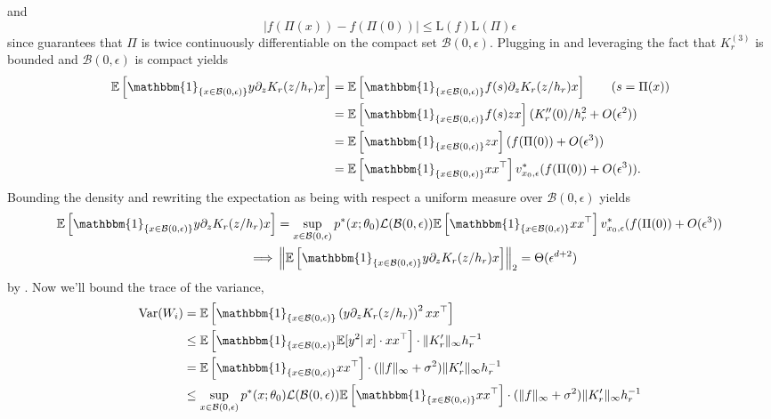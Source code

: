 \documentclass[11pt]{article}
\begin{document}
and
\[\left|f(\Pi(x)) - f(\Pi(0))\right| \leq \text{L}(f)\text{L}(\Pi)\epsilon\]
since  guarantees that $\Pi$ is twice continuously differentiable on the compact set $\mathcal{B}(0, \epsilon)$. Plugging in and leveraging the fact that $K^{(3)}_r$ is bounded and $\mathcal{B}(0, \epsilon)$ is compact yields
\begin{align*}
    \mathbb{E}\left[\mathbbm{1}_{\{x \in \mathcal{B}(0, \epsilon)\}}y\partial_{z}K_r(z/h_r)x\right] &= \mathbb{E}\left[\mathbbm{1}_{\{x \in \mathcal{B}(0, \epsilon)\}}f(s)\partial_{z}K_r(z/h_r)x\right] \tag{$s = \Pi(x)$} \\
    &= \mathbb{E}\left[\mathbbm{1}_{\{x \in \mathcal{B}(0, \epsilon)\}}f(s)zx\right](K''_r(0)/h_r^2 + O(\epsilon^2)) \\
    &= \mathbb{E}\left[\mathbbm{1}_{\{x \in \mathcal{B}(0, \epsilon)\}}zx\right](f(\Pi(0)) + O(\epsilon^3)) \\
    &= \mathbb{E}\left[\mathbbm{1}_{\{x \in \mathcal{B}(0, \epsilon)\}}xx^{\top}\right]v^*_{x_0, \epsilon}(f(\Pi(0)) + O(\epsilon^3)).
\end{align*}
Bounding the density and rewriting the expectation as being with respect a uniform measure over $\mathcal{B}(0, \epsilon)$ yields
\begin{align*}
    \mathbb{E}\left[\mathbbm{1}_{\{x \in \mathcal{B}(0, \epsilon)\}}y\partial_{z}K_r(z/h_r)x\right] &= \sup_{x\in \mathcal{B}(0, \epsilon)}p^*(x; \theta_0)\mathcal{L}(\mathcal{B}(0, \epsilon))\mathbb{E}\left[\mathbbm{1}_{\{x \in \mathcal{B}(0, \epsilon)\}}xx^{\top}\right]v^*_{x_0, \epsilon}(f(\Pi(0)) + O(\epsilon^3)) \\
    \implies &\left\|\mathbb{E}\left[\mathbbm{1}_{\{x \in \mathcal{B}(0, \epsilon)\}}y\partial_{z}K_r(z/h_r)x\right]\right\|_2 = \Theta(\epsilon^{d+2})
\end{align*}
by . Now we'll bound the trace of the variance,
\begin{align*}
    \operatorname{Var}(W_i) &= \mathbb{E}\left[\mathbbm{1}_{\{x \in \mathcal{B}(0, \epsilon)\}}\left(y\partial_{z}K_r(z/h_r)\right)^2xx^{\top}\right] \\
    &\leq \mathbb{E}\left[\mathbbm{1}_{\{x \in \mathcal{B}(0, \epsilon)\}}\mathbb{E}[y^2|\,x]\cdot xx^{\top}\right] \cdot \|K_r'\|_{\infty}h_r^{-1}\\
    &= \mathbb{E}\left[\mathbbm{1}_{\{x \in \mathcal{B}(0, \epsilon)\}} xx^{\top}\right] \cdot (\|f\|_{\infty} + \sigma^2)\|K_r'\|_{\infty}h_r^{-1} \\
    &\leq \sup_{x \in \mathcal{B}(0, \epsilon)}p^*(x; \theta_0) \mathcal{L}(\mathcal{B}(0, \epsilon))\mathbb{E}\left[\mathbbm{1}_{\{x \in \mathcal{B}(0, \epsilon)\}} xx^{\top}\right] \cdot (\|f\|_{\infty} + \sigma^2)\|K_r'\|_{\infty}h_r^{-1}
\end{align*}
\end{document}
